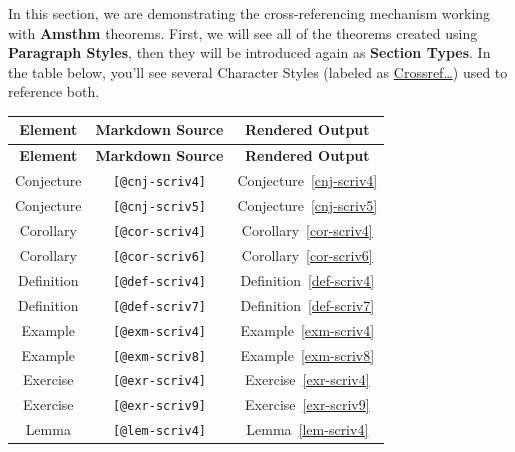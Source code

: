 \documentclass[
  12pt,
  a4paper,
  oneside,
  numbers=noenddot,
  titlepage,
  toclink=all,
  toc=bibliography]{scrbook}
\theoremstyle{definition}
\theoremstyle{definition}
\theoremstyle{definition}
\theoremstyle{plain}
\theoremstyle{plain}
\theoremstyle{plain}
\theoremstyle{plain}
\theoremstyle{plain}
\theoremstyle{remark}
\begin{document}
In this section, we are demonstrating the cross-referencing mechanism
working with \textbf{Amsthm} theorems. First, we will see all of the
theorems created using \textbf{Paragraph Styles}, then they will be
introduced again as \textbf{Section Types}. In the table below, you'll
see several Character Styles (labeled as \ul{Crossref\ldots{}}) used to
reference both.

\hypertarget{tbl-scriv4}{}
\begin{longtable}[]{@{}ccc@{}}
\toprule\noalign{}
\textbf{Element} & \textbf{Markdown Source} & \textbf{Rendered
Output} \\
\midrule\noalign{}
\endfirsthead
\toprule\noalign{}
\textbf{Element} & \textbf{Markdown Source} & \textbf{Rendered
Output} \\
\midrule\noalign{}
\endhead
\bottomrule\noalign{}
\endlastfoot
Conjecture & \texttt{{[}@cnj-scriv4{]}} &
\protect\hypertarget{cite_49}{}{\label{cite_49}Conjecture~\ref{cnj-scriv4}} \\
Conjecture & \texttt{{[}@cnj-scriv5{]}} &
\protect\hypertarget{cite_50}{}{\label{cite_50}Conjecture~\ref{cnj-scriv5}} \\
Corollary & \texttt{{[}@cor-scriv4{]}} &
\protect\hypertarget{cite_51}{}{\label{cite_51}Corollary~\ref{cor-scriv4}} \\
Corollary & \texttt{{[}@cor-scriv6{]}} &
\protect\hypertarget{cite_52}{}{\label{cite_52}Corollary~\ref{cor-scriv6}} \\
Definition & \texttt{{[}@def-scriv4{]}} &
\protect\hypertarget{cite_53}{}{\label{cite_53}Definition~\ref{def-scriv4}} \\
Definition & \texttt{{[}@def-scriv7{]}} &
\protect\hypertarget{cite_54}{}{\label{cite_54}Definition~\ref{def-scriv7}} \\
Example & \texttt{{[}@exm-scriv4{]}} &
\protect\hypertarget{cite_55}{}{\label{cite_55}Example~\ref{exm-scriv4}} \\
Example & \texttt{{[}@exm-scriv8{]}} &
\protect\hypertarget{cite_56}{}{\label{cite_56}Example~\ref{exm-scriv8}} \\
Exercise & \texttt{{[}@exr-scriv4{]}} &
\protect\hypertarget{cite_57}{}{\label{cite_57}Exercise~\ref{exr-scriv4}} \\
Exercise & \texttt{{[}@exr-scriv9{]}} &
\protect\hypertarget{cite_58}{}{\label{cite_58}Exercise~\ref{exr-scriv9}} \\
Lemma & \texttt{{[}@lem-scriv4{]}} &
\protect\hypertarget{cite_59}{}{\label{cite_59}Lemma~\ref{lem-scriv4}} \\

\end{longtable}
\end{document}
